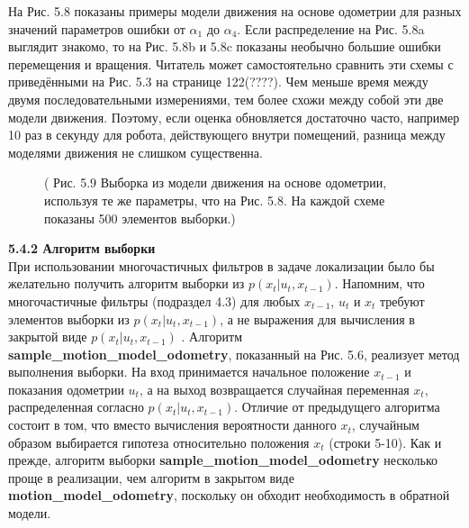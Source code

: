 \documentclass[10pt,a4paper]{article}
\begin{document}
На Рис. 5.8 показаны примеры модели движения на основе одометрии для разных значений параметров ошибки от $\alpha_1$ до $\alpha_4$. Если распределение на Рис. 5.8a выглядит знакомо, то на Рис. 5.8b и 5.8c показаны необычно большие ошибки перемещения и вращения. Читатель может самостоятельно сравнить эти схемы с приведёнными на Рис. 5.3 на странице 122(????). Чем меньше время между двумя последовательными измерениями, тем более схожи между собой эти две модели движения. Поэтому, если оценка обновляется достаточно часто, например 10 раз в секунду для робота, действующего внутри помещений, разница между моделями движения не слишком существенна.\\

\begin{figure}[H]
	\caption{ (  Рис. 5.9 Выборка из модели движения на основе одометрии, используя те же параметры, что на Рис. 5.8. На каждой схеме показаны 500 элементов выборки.)}
	\label{fig:59orig}
\end{figure}

\textbf{5.4.2 Алгоритм выборки}\\

При использовании многочастичных фильтров в задаче локализации было бы желательно получить алгоритм  выборки из $p(x_t | u_t, x_{t-1})$. Напомним, что многочастичные фильтры (подраздел 4.3) для любых $x_{t-1}$, $u_t$ и $x_t$ требуют элементов выборки из $p(x_t | u_t, x_{t-1})$, а не выражения для вычисления в закрытой виде $p(x_t | u_t, x_{t-1})$ . Алгоритм \textbf{sample\_motion\_model\_odometry}, показанный на Рис. 5.6, реализует метод выполнения выборки. На вход принимается начальное положение $x_{t-1}$ и показания одометрии $u_t$, а на выход возвращается случайная переменная $x_t$, распределенная согласно $p(x_t | u_t, x_{t-1})$.
Отличие от предыдущего алгоритма состоит в том, что вместо вычисления вероятности данного $x_t$, случайным образом выбирается гипотеза относительно положения $x_t$ (строки 5-10). Как и прежде,
алгоритм выборки \textbf{sample\_motion\_model\_odometry} несколько проще в реализации, чем алгоритм в закрытом виде \textbf{motion\_model\_odometry}, поскольку он обходит необходимость в обратной модели.
\end{document}
